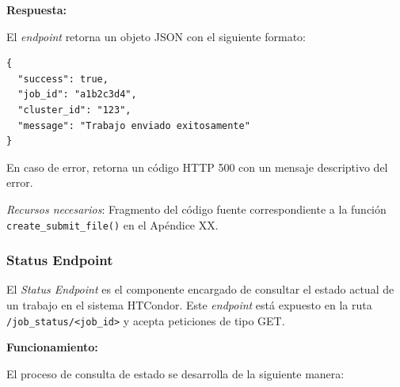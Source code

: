 \textbf{Respuesta:}

El \textit{endpoint} retorna un objeto JSON con el siguiente formato:

\begin{verbatim}
{
  "success": true,
  "job_id": "a1b2c3d4",
  "cluster_id": "123",
  "message": "Trabajo enviado exitosamente"
}
\end{verbatim}

En caso de error, retorna un código HTTP 500 con un mensaje descriptivo del error.

\textit{Recursos necesarios}: Fragmento del código fuente correspondiente a la función \texttt{create\_submit\_file()} en el Apéndice XX.

\subsubsection{Status Endpoint}
\noindent

El \textit{Status Endpoint} es el componente encargado de consultar el estado actual de un trabajo en el sistema HTCondor. Este \textit{endpoint} está expuesto en la ruta \texttt{/job\_status/<job\_id>} y acepta peticiones de tipo GET.

\textbf{Funcionamiento:}

El proceso de consulta de estado se desarrolla de la siguiente manera:

